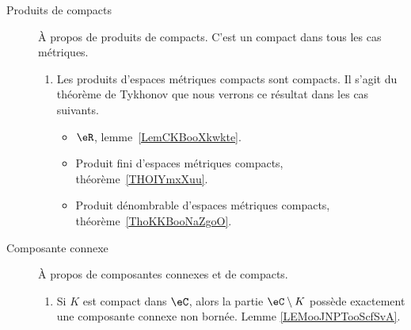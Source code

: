 \begin{description}
	\item[Produits de compacts]
		À propos de produits de compacts. C'est un compact dans tous les cas métriques.
		\begin{enumerate}
			\item
			      Les produits d'espaces métriques compacts sont compacts. Il s'agit du théorème de Tykhonov que nous verrons ce résultat dans les cas suivants.
			      \begin{itemize}
				      \item
				            \( \eR\), lemme~\ref{LemCKBooXkwkte}.
				      \item
				            Produit fini d'espaces métriques compacts, théorème~\ref{THOIYmxXuu}.
				      \item
				            Produit dénombrable d'espaces métriques compacts, théorème~\ref{ThoKKBooNaZgoO}.
			      \end{itemize}
		\end{enumerate}
	\item[Composante connexe]
		À propos de composantes connexes et de compacts.
		\begin{enumerate}
			\item
			      Si \( K\) est compact dans \( \eC\), alors la partie \( \eC\setminus K\) possède exactement une composante connexe non bornée. Lemme \ref{LEMooJNPTooScfSvA}.
		\end{enumerate}
\end{description}
